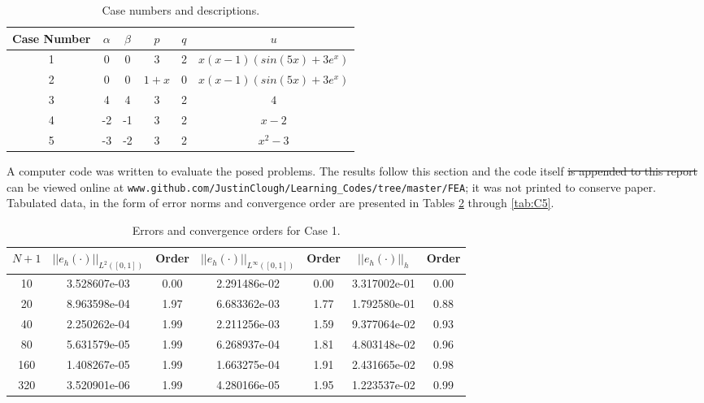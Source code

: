 \documentclass[a4paper, 12pt]{article}
\begin{document}
\begin{table}
\caption{ Case numbers and descriptions.}
\vspace{0.1in}
\centering
\begin{tabular}{ |c|c|c|c|c|c|}
  \hline
  Case Number & $\alpha$ & $\beta$ & $p$ & $q$ & $u$ \\
  \hline
  1           &   0      &  0      &  3  &  2  &  $x(x-1)(sin(5x)+3e^x)$ \\
  \hline
  2           &   0      &  0      &  $1+x$  &  0  &  $x(x-1)(sin(5x)+3e^x)$ \\
  \hline
  3           &   4      &  4      &  3  &  2  &  $4$ \\
  \hline
  4           &   -2     &  -1     &  3  &  2  &  $x-2$ \\
  \hline
  5           &   -3     &  -2     &  3  &  2  &  $x^2-3$ \\
  \hline
\end{tabular}
\label{tab:Cases}
\end{table}

A computer code was written to evaluate the posed problems. 
The results follow this section and the code itself 
\sout{is appended to this report} can be viewed online at 
\texttt{www.github.com/JustinClough/Learning\_Codes/tree/master/FEA}; 
it was not printed to conserve paper.
Tabulated data, in the form of error norms and convergence order 
are presented in Tables \ref{tab:C1} through \ref{tab:C5}.


\begin{table}[!ht]
\caption{Errors and convergence orders for Case 1.}
\vspace{0.1in}
\centering
\begin{tabular}{|c|c|c| c| c| c| c|}
\hline
 $N+1$&  $||e_h(\cdot)||_{L^2([0,1])}$ & Order  & $||e_h(\cdot)||_{L^\infty([0,1])}$ & Order& $||e_h(\cdot)||_h$& Order \\
 \hline
     10  &  3.528607e-03 & 0.00 & 2.291486e-02 & 0.00 & 3.317002e-01 & 0.00\\
     20  &  8.963598e-04 & 1.97 & 6.683362e-03 & 1.77 & 1.792580e-01 & 0.88\\
     40  &  2.250262e-04 & 1.99 & 2.211256e-03 & 1.59 & 9.377064e-02 & 0.93\\
     80  &  5.631579e-05 & 1.99 & 6.268937e-04 & 1.81 & 4.803148e-02 & 0.96\\
     160 &  1.408267e-05 & 1.99 & 1.663275e-04 & 1.91 & 2.431665e-02 & 0.98\\
     320 &  3.520901e-06 & 1.99 & 4.280166e-05 & 1.95 & 1.223537e-02 & 0.99\\
\hline
\end{tabular}
\label{tab:C1}
\end{table}
\end{document}
